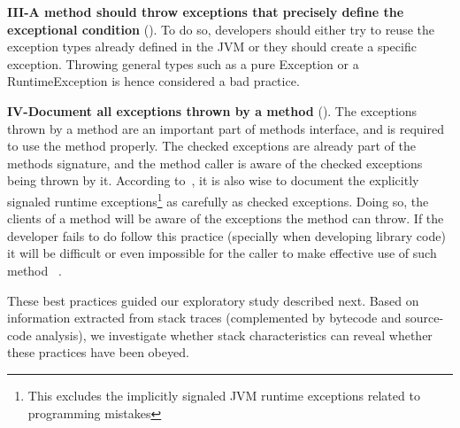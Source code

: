 \documentclass[conference]{IEEEtran}
\begin{document}

\textbf{III-A method should throw exceptions that precisely define the
exceptional condition} (\cite{gosling2000java,bloch2008effective}). To do so,
developers should either try to reuse the exception types already defined in the
JVM or they should create a specific exception. Throwing general types such as a
pure Exception or a RuntimeException is hence considered a bad practice.


\textbf{IV-Document all exceptions thrown by a
method} (\cite{mandrioli1992advances,gosling2000java,wirfs2006toward,bloch2008effective}).
The exceptions thrown by a method are an important part of methods interface,
and is required to use the method properly. The checked exceptions are already
part of the  methods signature, and the method caller is aware of the checked
exceptions being thrown by it. According to~\cite{bloch2008effective}, it is
also wise to document the explicitly signaled runtime exceptions\footnote{This
excludes the implicitly signaled JVM runtime exceptions related to programming
mistakes} as carefully as checked exceptions. Doing so, the clients of a method
will be aware of the exceptions the method can throw. If the developer fails to
do follow this practice (specially when developing library code) it will be
difficult or even impossible for the caller to make effective use of such method
~\cite{wirfs2006toward, bloch2008effective}.

These best practices guided our exploratory study described next.
Based on information extracted from stack traces (complemented by
bytecode and source-code analysis), we investigate whether stack characteristics
can reveal whether these practices have been obeyed. 
\end{document}
